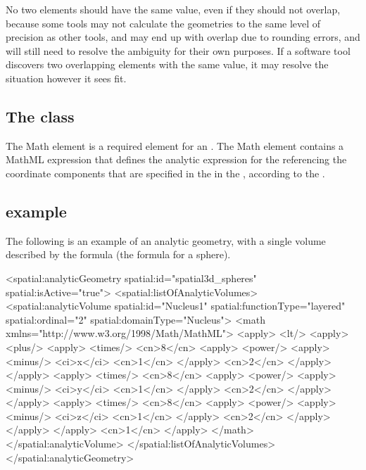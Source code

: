 No two \AnalyticVolume elements should have the same  value, even if they should not overlap, because some tools may not calculate the geometries to the same level of precision as other tools, and may end up with overlap due to rounding errors, and will still need to resolve the ambiguity for their own purposes.  If a software tool discovers two overlapping \AnalyticVolume elements with the same  value, it may resolve the situation however it sees fit.


\subsection{The  class}
\label{math-class}
The Math element is a required element for an \AnalyticVolume. The Math element contains a MathML expression that defines the analytic expression for the \AnalyticVolume referencing the coordinate components that are specified in the \ListOfCoordinateComponents in the \Geometry, according to the . 



\subsection{\AnalyticGeometry example}
\label{analyticvolume-example}
The following is an example of an analytic geometry, with a single volume described by the formula  (the formula for a sphere).

\begin{example}
 <spatial:analyticGeometry spatial:id="spatial3d_spheres" spatial:isActive="true">
   <spatial:listOfAnalyticVolumes>
     <spatial:analyticVolume spatial:id="Nucleus1" spatial:functionType="layered" spatial:ordinal="2"
                             spatial:domainType="Nucleus">
       <math xmlns="http://www.w3.org/1998/Math/MathML">
         <apply> <lt/> <apply> <plus/> <apply> <times/> <cn>8</cn> <apply> <power/> <apply> <minus/>
             <ci>x</ci> <cn>1</cn> </apply> <cn>2</cn> </apply> </apply> <apply> <times/>
             <cn>8</cn> <apply> <power/> <apply> <minus/> <ci>y</ci> <cn>1</cn> </apply> <cn>2</cn>
             </apply> </apply> <apply> <times/> <cn>8</cn> <apply> <power/> <apply> <minus/>
             <ci>z</ci> <cn>1</cn> </apply> <cn>2</cn> </apply> </apply> </apply> <cn>1</cn>
         </apply>
       </math>
     </spatial:analyticVolume>
   </spatial:listOfAnalyticVolumes>
 </spatial:analyticGeometry>
\end{example}

